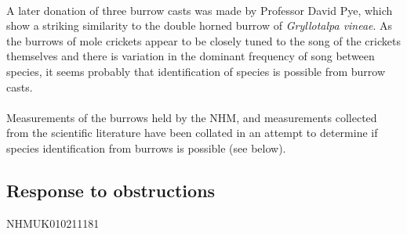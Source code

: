 \documentclass{article}
\begin{document}
   \paragraph{}
   A later donation of three burrow casts was made by Professor David Pye, which show a striking similarity to the double horned burrow of \textit{Gryllotalpa vineae}. As the burrows of mole crickets appear to be closely tuned to the song of the crickets themselves \cite{bennetclark1987,daws1996} and there is variation in the dominant frequency of song between species, it seems probably that identification of species is possible from burrow casts.
   
   \paragraph{}
   Measurements of the burrows held by the NHM, and measurements collected from the scientific literature have been collated in an attempt to determine if species identification from burrows is possible (see below).
   
   
   \subsection{Response to obstructions}
   NHMUK010211181
    
\end{document}
